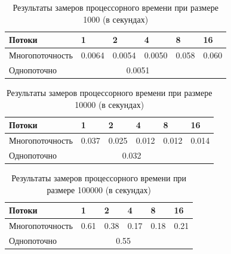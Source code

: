 \documentclass[12pt,a4paper]{report}
\begin{document}
\begin{table}[h!]
\caption{Результаты замеров процессорного времени при размере 1000 (в секундах)}
\label{tabular:timesandtenses}
\begin{center}
\begin{tabular}{ | l | l | l | l | l | l | }
\hline
        Потоки                   & 1     & 2     & 4     & 8     & 16   \\ \hline
        Многопоточность & 0.0064 & 0.0054 & 0.0050 & 0.058 & 0.060 \\ \hline
        Однопоточно              &       \multicolumn{4}{c}{0.0051}       &       \\ \hline
\end{tabular}
\end{center}
\end{table}

\begin{table}[h!]
\caption{Результаты замеров процессорного времени при размере 10000 (в секундах)}
\label{tabular:timesandtenses}
\begin{center}
\begin{tabular}{ | l | l | l | l | l | l | }
\hline
        Потоки                   & 1    & 2    & 4    & 8    & 16    \\ \hline
        Многопоточность  & 0.037 & 0.025 & 0.012 & 0.012 & 0.014 \\ \hline
        Однопоточно              &     \multicolumn{4}{c}{0.032}    &      \\ \hline
\end{tabular}
\end{center}
\end{table}

\begin{table}[h!]
\caption{Результаты замеров процессорного времени при размере 100000 (в секундах)}
\label{tabular:timesandtenses}
\begin{center}
\begin{tabular}{ | l | l | l | l | l | l | }
\hline
        Потоки                   & 1    & 2    & 4    & 8    & 16    \\ \hline
        Многопоточность & 0.61 & 0.38 & 0.17 & 0.18 & 0.21 \\ \hline
        Однопоточно              &     \multicolumn{4}{c}{0.55}     &      \\ \hline
\end{tabular}
\end{center}
\end{table}
\end{document}
